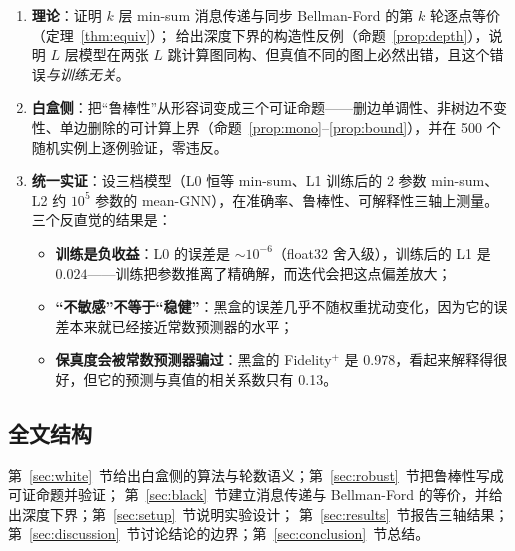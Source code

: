 \begin{enumerate}[leftmargin=1.8em]
\item \textbf{理论}：证明 $k$ 层 min-sum 消息传递与同步 Bellman-Ford 的第 $k$ 轮逐点等价（定理~\ref{thm:equiv}）；
      给出深度下界的构造性反例（命题~\ref{prop:depth}），说明 $L$ 层模型在两张 $L$ 跳计算图同构、但真值不同的图上必然出错，且这个错误\emph{与训练无关}。
\item \textbf{白盒侧}：把“鲁棒性”从形容词变成三个可证命题——删边单调性、非树边不变性、单边删除的可计算上界（命题~\ref{prop:mono}--\ref{prop:bound}），并在 500 个随机实例上逐例验证，零违反。
\item \textbf{统一实证}：设三档模型（L0 恒等 min-sum、L1 训练后的 2 参数 min-sum、L2 约 $10^5$ 参数的 mean-GNN），在准确率、鲁棒性、可解释性三轴上测量。
      三个反直觉的结果是：
      \begin{itemize}[leftmargin=1.4em]
      \item \textbf{训练是负收益}：L0 的误差是 $\sim10^{-6}$（float32 舍入级），训练后的 L1 是 $0.024$——训练把参数推离了精确解，而迭代会把这点偏差放大；
      \item \textbf{“不敏感”不等于“稳健”}：黑盒的误差几乎不随权重扰动变化，因为它的误差本来就已经接近常数预测器的水平；
      \item \textbf{保真度会被常数预测器骗过}：黑盒的 Fidelity$^+$ 是 0.978，看起来解释得很好，但它的预测与真值的相关系数只有 0.13。
      \end{itemize}
\end{enumerate}

\subsection{全文结构}

第~\ref{sec:white}~节给出白盒侧的算法与轮数语义；第~\ref{sec:robust}~节把鲁棒性写成可证命题并验证；
第~\ref{sec:black}~节建立消息传递与 Bellman-Ford 的等价，并给出深度下界；第~\ref{sec:setup}~节说明实验设计；
第~\ref{sec:results}~节报告三轴结果；第~\ref{sec:discussion}~节讨论结论的边界；第~\ref{sec:conclusion}~节总结。
